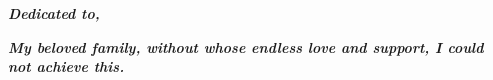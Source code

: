 
\chapter*{}

\begin{flushleft}
\textit{\textbf{\Large Dedicated to,}}
\end{flushleft}
\vspace*{1em}
\begin{flushright}
\textit{\textbf{\Large My beloved family, without whose endless love and support, I could not achieve this.}}
\end{flushright}
\vspace*{\fill}


\newpage
\thispagestyle{empty}
\null\newpage
